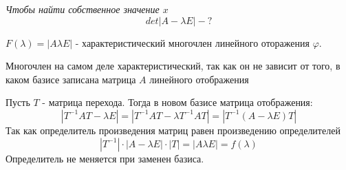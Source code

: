 \emph{Чтобы найти собственное значение $x$}\\
\[det|A - \lambda E| - ?\]

$F(\lambda) = |A \lambda E|$ - характеристический многочлен линейного оторажения
$\varphi$.\\

\begin{theorem}
Многочлен на самом деле характеристический, так как он не зависит от того, в
каком базисе записана матрица $A$ линейного отображения\\
\end{theorem}
Пусть $T$ - матрица перехода. Тогда в новом базисе матрица отображения:\\
\[|T^{-1} AT - \lambda E| = |T^{-1} AT - \lambda T^{-1} AT| = |T^{-1}
(A - \lambda E)T|\]
Так как определитель произведения матриц равен произведению определителей
\[|T^{-1}| \cdot |A - \lambda E| \cdot |T| = |A \lambda E| = f(\lambda)\]
Определитель не меняется при заменен базиса.\\